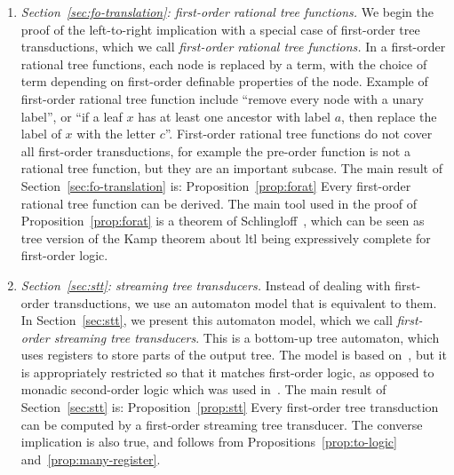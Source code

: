 \begin{enumerate}
    \item \emph{Section~\ref{sec:fo-translation}: first-order rational tree functions.} We begin the proof of the left-to-right  implication  with a special case of first-order tree transductions, which we call \emph{first-order rational tree functions.} In a first-order rational tree functions, each node is replaced by a term, with the choice of term depending on first-order definable properties of the node. Example of first-order rational tree function include  ``remove every node with a unary label'', or ``if a leaf $x$ has at least one ancestor with label $a$, then replace the label of $x$ with the letter $c$''. First-order rational tree functions do not cover all first-order transductions, for example the pre-order function is not a rational tree function, but they are an important subcase.
    The main result of Section~\ref{sec:fo-translation} is:
    \announce
    {Proposition~\ref{prop:forat}}
    {Every first-order rational tree function can be derived.}
    The main tool used in the proof of Proposition~\ref{prop:forat} is a theorem of Schlingloff~\cite[Theorem 2.6]{schlingloff1992expressive}, which can be seen as tree version of the Kamp theorem about {\sc ltl} being  expressively complete for first-order logic.  
    \item \emph{Section~\ref{sec:stt}: streaming tree transducers. }Instead of dealing with first-order transductions, we use an automaton model that is equivalent to them. In Section~\ref{sec:stt}, we present  this  automaton model, which we call \emph{first-order streaming tree transducers}. This  is a bottom-up tree automaton, which uses registers to store parts of the output tree. The model is based on~\cite{alur2017streaming}, but it is  appropriately restricted so that it matches first-order logic, as opposed to monadic second-order logic which was used in~\cite{alur2017streaming}. The main result of Section~\ref{sec:stt} is:
    \announce
    {Proposition~\ref{prop:stt}}
    {Every first-order  tree transduction can be computed by a first-order streaming tree transducer.}
    The converse implication is also true, and follows from Propositions~\ref{prop:to-logic} and~\ref{prop:many-register}.
    

\end{enumerate}
